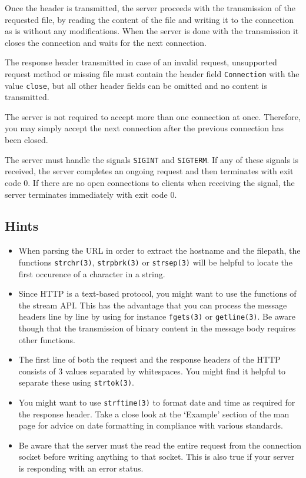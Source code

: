 Once the header is transmitted,
the server proceeds with the transmission of the requested file,
by reading the content of the file and writing it to the connection as is
without any modifications.
When the server is done with the transmission it closes the connection
and waits for the next connection.

The response header transmitted in case of an invalid request,
unsupported request method or missing file must contain
the header field \verb|Connection| with the value \verb|close|,
but all other header fields can be omitted and no content is transmitted.

The server is not required to accept more than one connection at once.
Therefore, you may simply accept the next connection
after the previous connection has been closed.

The server must handle the signals \verb|SIGINT| and \verb|SIGTERM|.
If any of these signals is received,
the server completes an ongoing request
and then terminates with exit code 0.
If there are no open connections to clients when receiving the signal,
the server terminates immediately with exit code 0.

\subsection*{Hints}
\begin{itemize}
\item When parsing the URL
in order to extract the hostname and the filepath,
the functions \verb|strchr(3)|, \verb|strpbrk(3)| or \verb|strsep(3)|
will be helpful to locate the first occurence of a character in a string.

\item Since HTTP is a text-based protocol,
you might want to use the functions of the stream API.
This has the advantage that you can process the message headers line by line
by using for instance \verb|fgets(3)| or \verb|getline(3)|.
Be aware though that the transmission of binary content
in the message body requires other functions.

\item The first line of both the request and the response headers of the HTTP
consists of 3 values separated by whitespaces.
You might find it helpful to separate these using \verb|strtok(3)|.

\item You might want to use \verb|strftime(3)|
to format date and time as required for the response header.
Take a close look at the `Example' section of the man page
for advice on date formatting in compliance with various standards.

\item Be aware that the server must the read the entire request
from the connection socket before writing anything to that socket.
This is also true if your server is responding with an error status.
\end{itemize}

